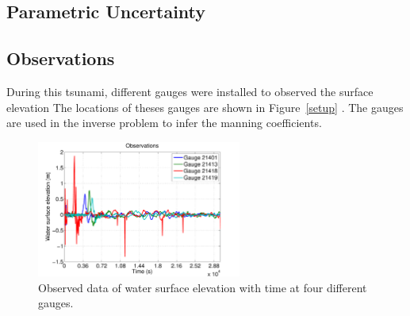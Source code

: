 \subsection{Parametric Uncertainty}
\subsection{Observations}
During this tsunami, different gauges were installed to observed the surface elevation
The locations of theses gauges are shown in Figure~\ref{setup} .
The gauges are used in the inverse problem to infer the manning coefficients.

\begin{figure}[h]      
\centering
\includegraphics[width=0.6\textwidth]{./figures/obs.pdf}
\caption{Observed data of water surface elevation with time at four different gauges.}
\label{fig:obs}
\end{figure}     
